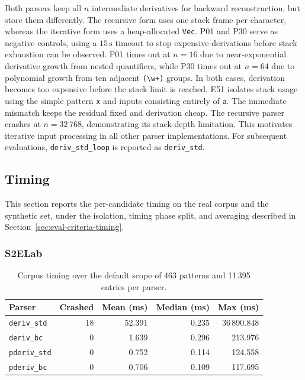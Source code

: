 Both parsers keep all $n$ intermediate derivatives
for backward reconstruction, but store them differently.
The recursive form uses one stack frame per character,
whereas the iterative form uses a heap-allocated \texttt{Vec}.
P01 and P30 serve as negative controls, using
a $15\,\mathrm{s}$ timeout to stop expensive derivations
before stack exhaustion can be observed.
P01 times out at $n=16$ due to near-exponential
derivative growth from nested quantifiers,
while P30 times out at $n=64$ due to polynomial
growth from ten adjacent \texttt{(\textbackslash w+)} groups.
In both cases, derivation becomes too expensive
before the stack limit is reached.
E51 isolates stack usage using the simple pattern
\texttt{x} and inputs consisting entirely of \texttt{a}.
The immediate mismatch keeps the
residual fixed and derivation cheap.
The recursive parser crashes at $n=32\,768$,
demonstrating its stack-depth limitation.
This motivates iterative input processing in
all other parser implementations.
For subsequent evaluations,
\texttt{deriv\_std\_loop} is reported as
\texttt{deriv\_std}.

%
%
%

\subsection{Timing}
\label{sec:eval-timing}

This section reports the per-candidate timing 
on the real corpus and the synthetic set, under the isolation, 
timing phase split, and averaging described in Section~\ref{sec:eval-criteria-timing}.

%
%
%

\subsubsection{S2ELab}
\label{sec:eval-timing-s2elab}

\begin{table}[H]
\centering
\small
\setlength{\tabcolsep}{4pt}
\begin{tabular*}{\textwidth}{@{\extracolsep{\fill}} lrrrr}
\hline
Parser & Crashed & Mean (ms) & Median (ms) & Max (ms) \\
\hline
\texttt{deriv\_std} & 18 & 52.391 & 0.235 & 36\,890.848 \\
\texttt{deriv\_bc}        &  0 &  1.639 & 0.296 &    213.976 \\
\texttt{pderiv\_std}      &  0 &  0.752 & 0.114 &    124.558 \\
\texttt{pderiv\_bc}       &  0 &  0.706 & 0.109 &    117.695 \\
\hline
\end{tabular*}
\caption{Corpus timing over the default scope of 463 patterns 
and 11\,395 entries per parser.}
\label{tab:corpus-timing}
\end{table}

